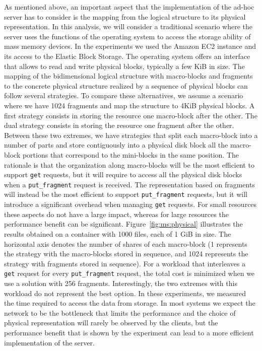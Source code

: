 As mentioned above, an important aspect that the implementation of the ad-hoc server has to consider is the mapping from the logical structure to its physical representation. In this analysis, we will consider a traditional scenario where the server uses the functions of the operating system to access the storage ability of mass memory devices. In the experiments we used the Amazon EC2 instance and its access to the Elastic Block Storage. The operating system offers an interface that allows to read and write physical blocks, typically a few KiB in size. The mapping of the bidimensional logical structure with macro-blocks and fragments to the concrete physical structure realized by a sequence of physical blocks can follow several strategies. To compare these alternatives, we assume a scenario where we have 1024 fragments and map the structure to 4KiB physical blocks. A first strategy consists in storing the resource one macro-block after the other. The dual strategy consists in storing the resource one fragment after the other. Between these two extremes, we have strategies that split each macro-block into a number of parts and store contiguously into a physical disk block all the macro-block portions that correspond to the mini-blocks in the same position. The rationale is that the organization along macro-blocks will be the most efficient to support {\tt get} requests, but it will require to access all the physical disk blocks when a {\tt put\_fragment} request is received. The representation based on fragments will instead be the most efficient to support {\tt put\_fragment} requests, but it will introduce a significant overhead when managing {\tt get} requests. For small resources these aspects do not have a large impact, whereas for large resources the performance benefit can be significant. Figure~\ref{fig:ms:physical} illustrates the results obtained on a container with 1000 files, each of 1 GiB in size. The horizontal axis denotes the number of shares of each macro-block (1 represents the strategy with the macro-blocks stored in sequence, and 1024 represents the strategy with fragments stored in sequence). For a workload that interleaves a {\tt get} request for every {\tt put\_fragment} request, the total cost is minimized when we use a solution with 256 fragments. Interestingly, the two extremes with this workload do not represent the best option. In these experiments, we measured the time required to access the data from storage. In most systems we expect the network to be the bottleneck that limits the performance and the choice of physical representation will rarely be observed by the clients, but the performance benefit that is shown by the experiment can lead to a more efficient implementation of the server.

